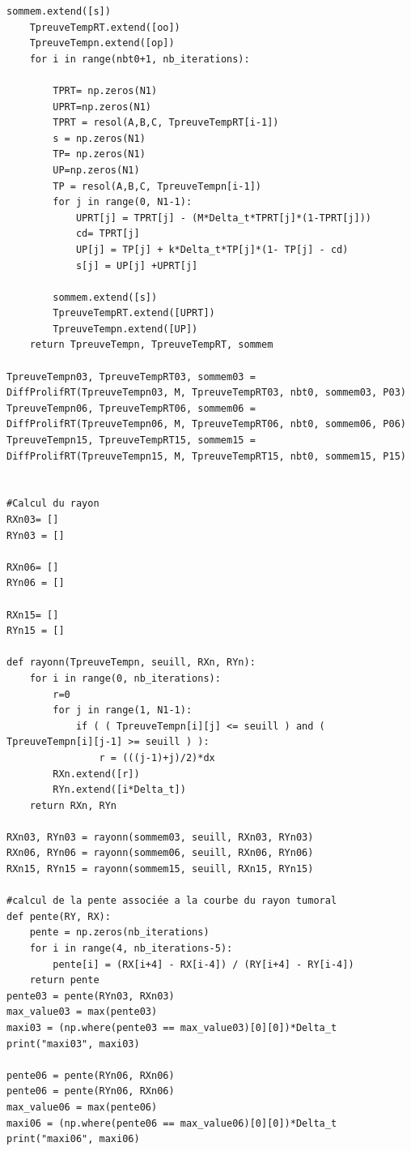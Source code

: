 \documentclass[12pt,a4paper]{article}
\begin{document}
\begin{lstlisting}[style=stylepython]
    sommem.extend([s])    
    TpreuveTempRT.extend([oo])
    TpreuveTempn.extend([op])
    for i in range(nbt0+1, nb_iterations):
        
        TPRT= np.zeros(N1)
        UPRT=np.zeros(N1)
        TPRT = resol(A,B,C, TpreuveTempRT[i-1])
        s = np.zeros(N1)
        TP= np.zeros(N1)
        UP=np.zeros(N1)
        TP = resol(A,B,C, TpreuveTempn[i-1])
        for j in range(0, N1-1):
            UPRT[j] = TPRT[j] - (M*Delta_t*TPRT[j]*(1-TPRT[j]))
            cd= TPRT[j]
            UP[j] = TP[j] + k*Delta_t*TP[j]*(1- TP[j] - cd)
            s[j] = UP[j] +UPRT[j]
            
        sommem.extend([s])
        TpreuveTempRT.extend([UPRT])
        TpreuveTempn.extend([UP])
    return TpreuveTempn, TpreuveTempRT, sommem

TpreuveTempn03, TpreuveTempRT03, sommem03 = DiffProlifRT(TpreuveTempn03, M, TpreuveTempRT03, nbt0, sommem03, P03) 
TpreuveTempn06, TpreuveTempRT06, sommem06 = DiffProlifRT(TpreuveTempn06, M, TpreuveTempRT06, nbt0, sommem06, P06) 
TpreuveTempn15, TpreuveTempRT15, sommem15 = DiffProlifRT(TpreuveTempn15, M, TpreuveTempRT15, nbt0, sommem15, P15) 


#Calcul du rayon 
RXn03= []
RYn03 = []

RXn06= []
RYn06 = []

RXn15= []
RYn15 = []

def rayonn(TpreuveTempn, seuill, RXn, RYn):
    for i in range(0, nb_iterations):
        r=0
        for j in range(1, N1-1):
            if ( ( TpreuveTempn[i][j] <= seuill ) and ( TpreuveTempn[i][j-1] >= seuill ) ):
                r = (((j-1)+j)/2)*dx
        RXn.extend([r])
        RYn.extend([i*Delta_t])
    return RXn, RYn
                
RXn03, RYn03 = rayonn(sommem03, seuill, RXn03, RYn03)  
RXn06, RYn06 = rayonn(sommem06, seuill, RXn06, RYn06)  
RXn15, RYn15 = rayonn(sommem15, seuill, RXn15, RYn15)

#calcul de la pente associée a la courbe du rayon tumoral 
def pente(RY, RX):
    pente = np.zeros(nb_iterations)
    for i in range(4, nb_iterations-5):
        pente[i] = (RX[i+4] - RX[i-4]) / (RY[i+4] - RY[i-4])
    return pente 
pente03 = pente(RYn03, RXn03)
max_value03 = max(pente03)
maxi03 = (np.where(pente03 == max_value03)[0][0])*Delta_t
print("maxi03", maxi03)

pente06 = pente(RYn06, RXn06)
pente06 = pente(RYn06, RXn06)
max_value06 = max(pente06)
maxi06 = (np.where(pente06 == max_value06)[0][0])*Delta_t
print("maxi06", maxi06)


\end{lstlisting}
\end{document}
